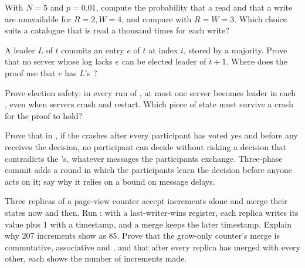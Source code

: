\begin{exercise}[$\star\star$]\label{exo:b3:replication-and-consensus:8}
With $N = 5$ and $p = 0.01$, compute the probability that a read and that a write are unavailable for $R = 2, W = 4$, and compare with $R = W = 3$. Which choice suits a catalogue that is read a thousand times for each write?
\end{exercise}

\begin{exercise}[$\star\star$]\label{exo:b3:replication-and-consensus:9}
A leader $L$ of  $t$ commits an entry $e$ of  $t$ at index $i$, stored by a majority. Prove that no server whose log lacks $e$ can be elected leader of  $t + 1$. Where does the proof use that $e$ has $L$'s ?
\end{exercise}

\begin{exercise}[$\star\star\star$]\label{exo:b3:replication-and-consensus:10}
Prove election safety: in every run of , at most one server becomes leader in each , even when servers crash and restart. Which piece of state must survive a crash for the proof to hold?
\end{exercise}

\begin{exercise}[$\star\star\star$]\label{exo:b3:replication-and-consensus:11}
Prove that in , if the  crashes after every participant has voted yes and before any receives the decision, no participant can decide without risking a decision that contradicts the 's, whatever messages the participants exchange. Three-phase commit adds a round in which the participants learn the decision before anyone acts on it; say why it relies on a bound on message delays.
\end{exercise}

\begin{exercise}[$\star\star\star$]\label{exo:b3:replication-and-consensus:12}
Three replicas of a page-view counter accept increments alone and merge their states now and then. Run : with a last-writer-wins register, each replica writes its value plus 1 with a timestamp, and a merge keeps the later timestamp. Explain why 207 increments show as 85. Prove that the grow-only counter's merge is commutative, associative and , and that after every replica has merged with every other, each shows the number of increments made.
\end{exercise}

